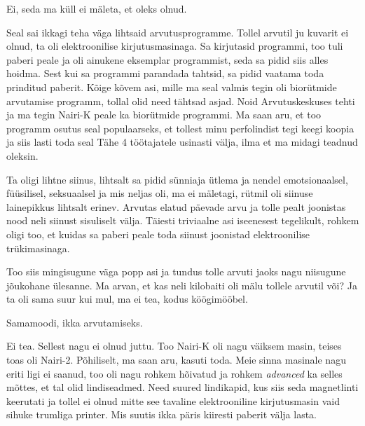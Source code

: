 Ei, seda ma küll ei mäleta, et oleks olnud.


Seal sai ikkagi teha väga lihtsaid  arvutusprogramme. Tollel 
arvutil ju kuvarit ei olnud, ta oli elektroonilise kirjutusmasinaga. Sa 
kirjutasid programmi, too tuli paberi peale ja  oli ainukene eksemplar  
programmist, seda sa pidid siis alles hoidma. Sest kui sa programmi parandada 
tahtsid, sa pidid vaatama toda prinditud paberit. Kõige kõvem asi, mille ma 
seal valmis tegin oli biorütmide arvutamise programm, tollal olid need 
tähtsad asjad. Noid Arvutuskeskuses tehti 
ja  ma tegin Nairi-K 
peale ka  biorütmide programmi. Ma saan aru, et too programm osutus seal 
populaarseks, et tollest 
minu perfolindist tegi keegi koopia ja siis lasti toda seal Tähe 4 
töötajatele usinasti välja, ilma et ma midagi teadnud oleksin.


Ta oligi lihtne siinus,  lihtsalt sa pidid  sünniaja ütlema ja  nendel emotsionaalsel, füüsilisel,  seksuaalsel ja mis neljas oli, ma ei mäletagi, rütmil oli  siinuse 
lainepikkus lihtsalt erinev. Arvutas elatud päevade arvu ja tolle pealt 
joonistas nood neli siinust sisuliselt välja. Täiesti 
triviaalne asi iseenesest tegelikult, rohkem oligi too, et kuidas sa paberi 
peale toda siinust joonistad elektroonilise trükimasinaga. 


Too siis mingisugune väga popp asi ja tundus tolle arvuti jaoks nagu niisugune 
jõukohane ülesanne. Ma arvan, et kas neli kilobaiti oli mälu tollele arvutil 
või? Ja ta oli sama suur kui mul, ma ei tea, kodus köögimööbel.


Samamoodi, ikka arvutamiseks.


Ei tea. Sellest nagu ei olnud juttu. Too Nairi-K oli 
nagu väiksem masin, teises toas oli Nairi-2. Põhiliselt, 
ma saan aru, kasuti toda. Meie sinna masinale nagu eriti ligi ei saanud, too 
oli nagu rohkem hõivatud ja rohkem \emph{advanced} ka selles mõttes, et 
tal olid lindiseadmed. Need suured lindikapid, kus siis seda magnetlinti 
keerutati ja tollel ei olnud mitte see tavaline elektrooniline kirjutusmasin 
vaid sihuke trumliga printer. Mis suutis ikka päris kiiresti paberit  
välja lasta.

